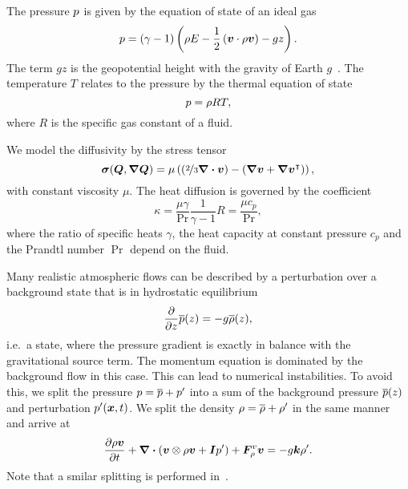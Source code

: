 \documentclass[runningheads]{llncs}
\begin{document}
The pressure $p$ is given by the equation of state of an ideal gas
\begin{equation}
  \label{eq:eos}
  p = (\gamma - 1) \left(\rho E - \frac{1}{2} \left(\bm{v} \cdot \rho \bm{v} \right) - gz \right).
\end{equation}
The term $gz$ is the geopotential height with the gravity of Earth $g$~\cite{giraldo2008study}.
The temperature $T$ relates to the pressure by the thermal equation of state
\begin{equation}
  \label{eq:temperature}
  p = \rho R T,
\end{equation}
where $R$ is the specific gas constant of a fluid.

We model the diffusivity by the stress tensor
\begin{equation}
  \label{eq:stress-tensor}
  \stressT(\Q, \gradQ) =
  \mu
  \left(
  \left(\nicefrac{2}{3} \divergence{\Qv} \right) -
  \left( \gradient{\Qv} + \gradient{\Qv}^\intercal \right)
  \right),
\end{equation}
with constant viscosity $\mu$.
The heat diffusion is governed by the coefficient
\begin{equation}
  \label{eq:heat-conduction-coeff}
  \kappa = \frac{\mu \gamma}{\Pr} \frac{1}{\gamma - 1} R = \frac{\mu c_p}{\Pr},
\end{equation}
where the ratio of specific heats $\gamma$, the heat capacity at constant pressure $c_p$ and the Prandtl number $\Pr$ depend on the fluid.

Many realistic atmospheric flows can be described by a perturbation over a background state that is in hydrostatic equilibrium
\newcommand{\backgroundPressure}{\overline{\pressure}}
\newcommand{\backgroundRho}{\overline{\Qrho}}
\begin{equation}
  \label{eq:hydrostatic-balance}
  \pdv{}{z} \backgroundPressure{\left (z \right )} = -g \backgroundRho(z),
\end{equation}
i.e.\ a state, where the pressure gradient is exactly in balance with the gravitational source term.
The momentum equation is dominated by the background flow in this case.
This can lead to numerical instabilities.
To avoid this, we split the pressure $\pressure = \backgroundPressure + \pressure'$ into a sum of the background pressure $\backgroundPressure(z)$ and perturbation $p'(\bm{x}, t)$.
We split the density $\Qrho = \backgroundRho + \Qrho'$ in the same manner and arrive at
\begin{equation}
  \label{eq:momentum-equation-split}
  \pdv{\Qj}{t}+ \divergence{ \left(
    \Qv \otimes \Qj + \bm{I} \pressure'
    \right)
  } + \viscFlux_\Qj
  =
  -g \bm{k} \Qrho'.
\end{equation}
Note that a smilar splitting is performed in~\cite{muller2010adaptive,giraldo2008study}.
\end{document}
